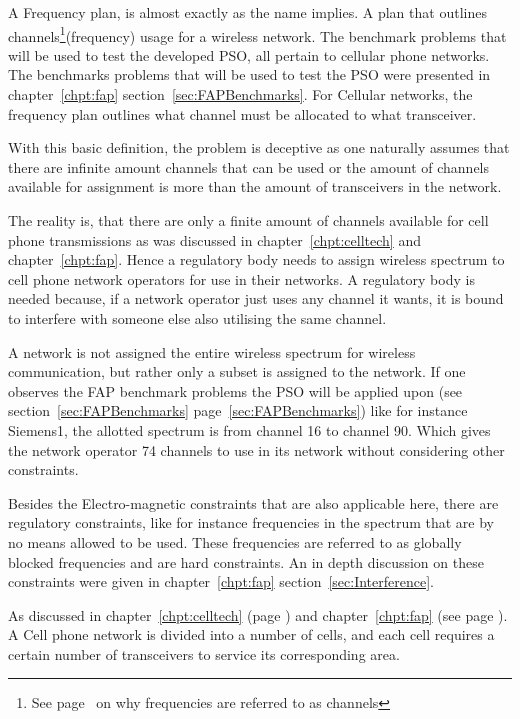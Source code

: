 A Frequency plan, is almost exactly as the name implies. A plan that outlines channels\footnote{See page~\pageref{def:channel} on why frequencies are referred to as channels}(frequency) usage for a wireless network. The benchmark problems that will be used to test the developed PSO, all pertain to cellular phone networks. The benchmarks problems that will be used to test the PSO were presented in chapter~\ref{chpt:fap} section~\ref{sec:FAPBenchmarks}. For Cellular networks, the frequency plan outlines what channel must be allocated to what transceiver.

With this basic definition, the problem is deceptive as one naturally assumes that there are infinite amount channels that can be used or the amount of channels available for assignment is more than the amount of transceivers in the network. 

The reality is, that there are only a finite amount of channels available for cell phone transmissions as was discussed in chapter~\ref{chpt:celltech} and chapter~\ref{chpt:fap}. Hence a regulatory body needs to assign wireless spectrum to cell phone network operators for use in their networks. A regulatory body is needed because, if a network operator just uses any channel it wants, it is bound to interfere with someone else also utilising the same channel.

A network is not assigned the entire wireless spectrum for wireless communication, but rather only a subset is assigned to the network. If one observes the FAP benchmark problems the PSO will be applied upon (see section~\ref{sec:FAPBenchmarks} page~\ref{sec:FAPBenchmarks}) like for instance Siemens1, the allotted spectrum is from channel 16 to channel 90. Which gives the network operator 74 channels to use in its network without considering other constraints. 

Besides the Electro-magnetic constraints that are also applicable here, there are regulatory constraints, like for instance frequencies in the spectrum that are by no means allowed to be used. These frequencies are referred to as globally blocked frequencies and are hard constraints. An in depth discussion on these constraints were given in chapter~\ref{chpt:fap} section~\ref{sec:Interference}.

As discussed in chapter~\ref{chpt:celltech} (page \pageref{chpt:celltech}) and chapter~\ref{chpt:fap} (see page \pageref{chpt:fap}). A Cell phone network is divided into a number of cells, and each cell requires a certain number of transceivers to service its corresponding area. 

